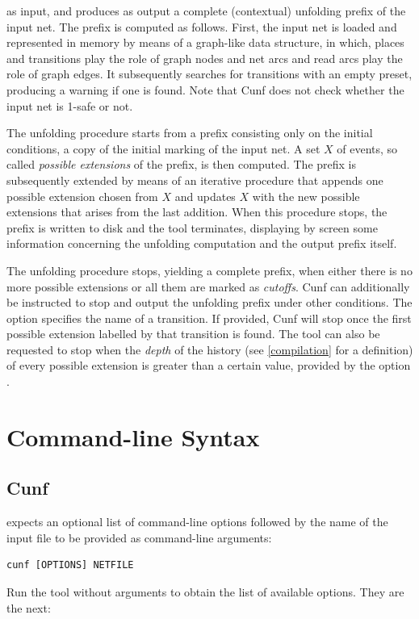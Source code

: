 \documentclass[a4paper]{refart}
\begin{document}
as input, and produces as output
a complete (contextual) unfolding prefix of the input net.  The prefix is
computed as follows.  First, the input net is loaded and represented in
memory by means of a graph-like data structure, in which, places and
transitions play the role of graph nodes and net arcs and read arcs play
the role of graph edges.  It subsequently searches for transitions with an
empty preset, producing a warning if one is found.  Note that Cunf does not
check whether the input net is 1-safe or not.

The unfolding procedure starts from a prefix consisting only on the initial
conditions, a copy of the initial marking of the input net.  A set $X$ of
events, so called \textit{possible extensions} of the prefix, is then
computed.  The prefix is subsequently extended by means of an iterative
procedure that appends one possible extension chosen from $X$ and updates
$X$ with the new possible extensions that arises from the last addition.
When this procedure stops, the prefix is written to disk and the tool
terminates, displaying by screen some information concerning the unfolding
computation and the output prefix itself.

The unfolding procedure stops, yielding a complete prefix, when either
there is no more possible extensions or all them are marked as
\textit{cutoffs}.  Cunf can additionally be instructed to stop and output
the unfolding prefix under other conditions.  The option 
specifies the name of a transition.  If provided, Cunf will stop once the
first possible extension labelled by that transition is found.  The tool
can also be requested to stop when the \textit{depth} of the history (see
\cref{compilation} for a definition) of every possible extension is greater
than a certain value, provided by the option .

\fi%
\section{Command-line Syntax}%
\subsection{Cunf}%

\cunf expects an optional list of command-line options followed by the
name of the input file to be provided as command-line arguments:
\begin{verbatim}
cunf [OPTIONS] NETFILE
\end{verbatim}
Run the tool without arguments to obtain the list of available options.
They are the next:
\end{document}
